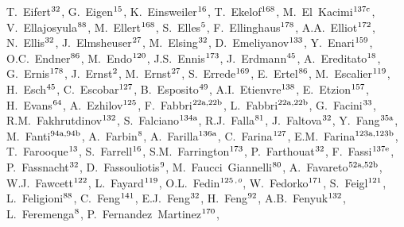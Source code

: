 \begin{flushleft}
T.~Eifert$^\textrm{\scriptsize 32}$,
G.~Eigen$^\textrm{\scriptsize 15}$,
K.~Einsweiler$^\textrm{\scriptsize 16}$,
T.~Ekelof$^\textrm{\scriptsize 168}$,
M.~El~Kacimi$^\textrm{\scriptsize 137c}$,
V.~Ellajosyula$^\textrm{\scriptsize 88}$,
M.~Ellert$^\textrm{\scriptsize 168}$,
S.~Elles$^\textrm{\scriptsize 5}$,
F.~Ellinghaus$^\textrm{\scriptsize 178}$,
A.A.~Elliot$^\textrm{\scriptsize 172}$,
N.~Ellis$^\textrm{\scriptsize 32}$,
J.~Elmsheuser$^\textrm{\scriptsize 27}$,
M.~Elsing$^\textrm{\scriptsize 32}$,
D.~Emeliyanov$^\textrm{\scriptsize 133}$,
Y.~Enari$^\textrm{\scriptsize 159}$,
O.C.~Endner$^\textrm{\scriptsize 86}$,
M.~Endo$^\textrm{\scriptsize 120}$,
J.S.~Ennis$^\textrm{\scriptsize 173}$,
J.~Erdmann$^\textrm{\scriptsize 45}$,
A.~Ereditato$^\textrm{\scriptsize 18}$,
G.~Ernis$^\textrm{\scriptsize 178}$,
J.~Ernst$^\textrm{\scriptsize 2}$,
M.~Ernst$^\textrm{\scriptsize 27}$,
S.~Errede$^\textrm{\scriptsize 169}$,
E.~Ertel$^\textrm{\scriptsize 86}$,
M.~Escalier$^\textrm{\scriptsize 119}$,
H.~Esch$^\textrm{\scriptsize 45}$,
C.~Escobar$^\textrm{\scriptsize 127}$,
B.~Esposito$^\textrm{\scriptsize 49}$,
A.I.~Etienvre$^\textrm{\scriptsize 138}$,
E.~Etzion$^\textrm{\scriptsize 157}$,
H.~Evans$^\textrm{\scriptsize 64}$,
A.~Ezhilov$^\textrm{\scriptsize 125}$,
F.~Fabbri$^\textrm{\scriptsize 22a,22b}$,
L.~Fabbri$^\textrm{\scriptsize 22a,22b}$,
G.~Facini$^\textrm{\scriptsize 33}$,
R.M.~Fakhrutdinov$^\textrm{\scriptsize 132}$,
S.~Falciano$^\textrm{\scriptsize 134a}$,
R.J.~Falla$^\textrm{\scriptsize 81}$,
J.~Faltova$^\textrm{\scriptsize 32}$,
Y.~Fang$^\textrm{\scriptsize 35a}$,
M.~Fanti$^\textrm{\scriptsize 94a,94b}$,
A.~Farbin$^\textrm{\scriptsize 8}$,
A.~Farilla$^\textrm{\scriptsize 136a}$,
C.~Farina$^\textrm{\scriptsize 127}$,
E.M.~Farina$^\textrm{\scriptsize 123a,123b}$,
T.~Farooque$^\textrm{\scriptsize 13}$,
S.~Farrell$^\textrm{\scriptsize 16}$,
S.M.~Farrington$^\textrm{\scriptsize 173}$,
P.~Farthouat$^\textrm{\scriptsize 32}$,
F.~Fassi$^\textrm{\scriptsize 137e}$,
P.~Fassnacht$^\textrm{\scriptsize 32}$,
D.~Fassouliotis$^\textrm{\scriptsize 9}$,
M.~Faucci~Giannelli$^\textrm{\scriptsize 80}$,
A.~Favareto$^\textrm{\scriptsize 52a,52b}$,
W.J.~Fawcett$^\textrm{\scriptsize 122}$,
L.~Fayard$^\textrm{\scriptsize 119}$,
O.L.~Fedin$^\textrm{\scriptsize 125}$$^{,o}$,
W.~Fedorko$^\textrm{\scriptsize 171}$,
S.~Feigl$^\textrm{\scriptsize 121}$,
L.~Feligioni$^\textrm{\scriptsize 88}$,
C.~Feng$^\textrm{\scriptsize 141}$,
E.J.~Feng$^\textrm{\scriptsize 32}$,
H.~Feng$^\textrm{\scriptsize 92}$,
A.B.~Fenyuk$^\textrm{\scriptsize 132}$,
L.~Feremenga$^\textrm{\scriptsize 8}$,
P.~Fernandez~Martinez$^\textrm{\scriptsize 170}$,
$$
\end{flushleft}
